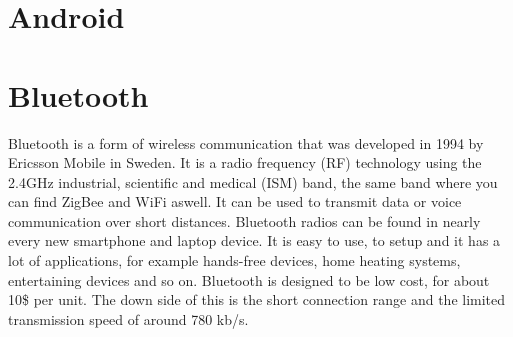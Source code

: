 \documentclass[a4paper, 11pt]{report}
\begin{document}





\section{Android}


	
\section{Bluetooth}
Bluetooth is a form of wireless communication that was developed in 1994 by Ericsson Mobile in Sweden. It is a radio frequency (RF) technology using the 2.4GHz industrial, scientific and medical (ISM) band, the same band where you can find ZigBee and WiFi aswell. It can be used to transmit data or voice communication over short distances. Bluetooth radios can be found in nearly every new smartphone and laptop device. It is easy to use, to setup and it has a lot of applications, for example hands-free devices, home heating systems, entertaining devices and so on. Bluetooth is designed to be low cost, for about 10\$ per unit. The down side of this is the short connection range and the limited transmission speed of around 780 kb/s\cite{bluetoothTech}.\\
\end{document}
